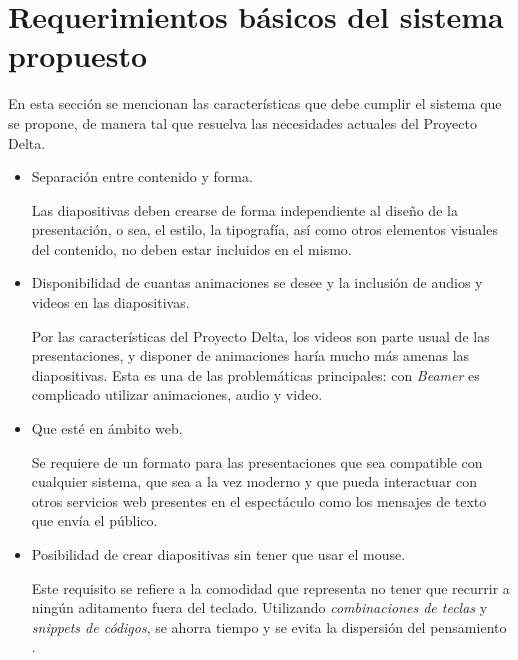 	\section{Requerimientos básicos del sistema propuesto} %
	\label{sec:requerimientos_basicos_del_sistema_propuesto}
		En esta sección se mencionan las características que debe cumplir el sistema que se propone, de manera tal que resuelva las necesidades actuales del Proyecto Delta.
		\begin{itemize}
				\item Separación entre contenido y forma. 

					Las diapositivas deben crearse de forma independiente al diseño de la presentación, o sea, el estilo, la tipografía, así como otros elementos visuales del contenido, no deben estar incluidos en el mismo. 


				\item Disponibilidad de cuantas animaciones se desee y la inclusión de audios y videos en las diapositivas. 

					Por las características del Proyecto Delta, los videos son parte usual de las presentaciones, y disponer de animaciones haría mucho más amenas las diapositivas. Esta es una de las problemáticas principales: con \textit{Beamer} es complicado utilizar animaciones, audio y video.

				\item Que esté en ámbito web. 

					Se requiere de un formato para las presentaciones que sea compatible con cualquier sistema, que sea a la vez moderno y que pueda interactuar con otros servicios web presentes en el espectáculo como los mensajes de texto que envía el público.


				\item Posibilidad de crear diapositivas sin tener que usar el mouse. 

					Este requisito se refiere a la comodidad que representa no tener que recurrir a ningún aditamento fuera del teclado. Utilizando \textit{combinaciones de teclas} y \textit{snippets de códigos}, se ahorra tiempo y se evita la dispersión del pensamiento \cite{donjones}.
		\end{itemize}	


